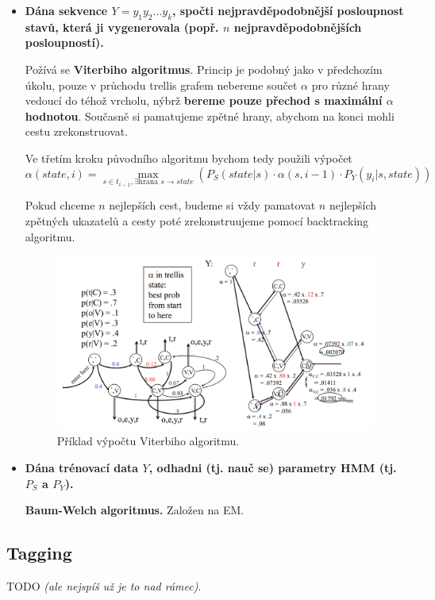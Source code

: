 \documentclass[11pt]{report} %
\numberwithin{equation}{section}
\begin{document}
\begin{itemize}
	
	
	\item \textbf{Dána sekvence $Y = y_1y_2\dots y_k$, spočti nejpravděpodobnější posloupnost stavů, která ji vygenerovala (popř. $n$ nejpravděpodobnějších posloupností).}
	
	Požívá se \textbf{Viterbiho algoritmus}. Princip je podobný jako v předchozím úkolu, pouze v průchodu trellis grafem nebereme součet $\alpha$ pro různé hrany vedoucí do téhož vrcholu, nýbrž \textbf{bereme pouze přechod s maximální $\alpha$ hodnotou}. Současně si pamatujeme zpětné hrany, abychom na konci mohli cestu zrekonstruovat.
		
	Ve třetím kroku původního algoritmu bychom tedy použili výpočet  $$\alpha(state,i) = \max\limits_{s \in t_{i-1}, \exists\text{hrana }s\rightarrow state} (P_S(state|s) \cdot \alpha(s, i-1) \cdot P_Y(y_i|s,state))$$
	
	Pokud chceme $n$ nejlepších cest, budeme si vždy pamatovat $n$ nejlepších zpětných ukazatelů a cesty poté zrekonstruujeme pomocí backtracking algoritmu.
	
	\begin{figure}[H]
		\centering
		\includegraphics[scale=1]{img/viterbi.png}
		\caption{Příklad výpočtu Viterbiho algoritmu.}
	\end{figure}


	\item \textbf{Dána trénovací data $Y$, odhadni (tj. nauč se) parametry HMM (tj. $P_S$ a $P_Y$).}
	
	\textbf{Baum-Welch algoritmus.} Založen na EM. %
	
\end{itemize}


\subsection{Tagging}
TODO \textit{(ale nejspíš už je to nad rámec)}.
\end{document}
